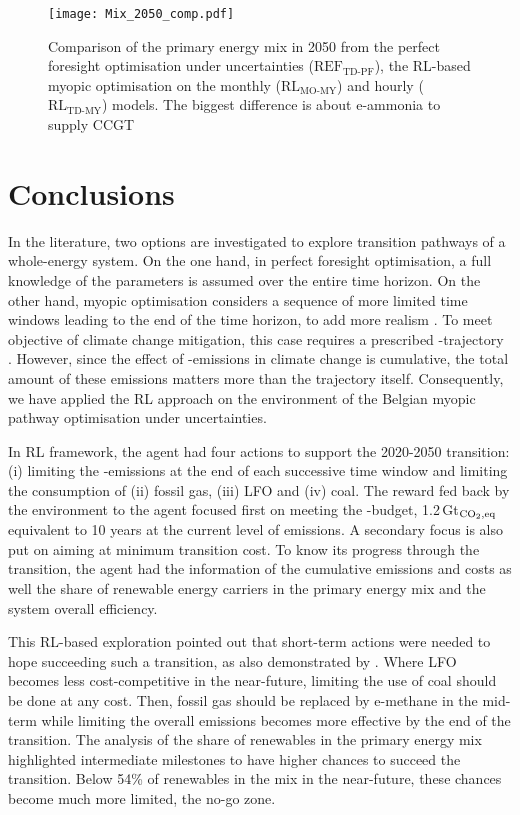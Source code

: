 \begin{figure}[!htbp]
\centering
\texttt{[image: Mix\_2050\_comp.pdf]}
\caption{Comparison of the primary energy mix in 2050 from the perfect foresight optimisation under uncertainties ($\text{REF}_{\text{TD-PF}}$), the \gls{RL}-based myopic optimisation on the monthly ($\text{RL}_{\text{MO-MY}}$) and hourly ($\text{RL}_{\text{TD-MY}}$) models. The biggest difference is about e-ammonia to supply \gls{CCGT}}
\label{fig:Mix_2050_comp}
\end{figure}


\section{Conclusions}
\label{sec:RL:conclusions}
In the literature, two options are investigated to explore transition pathways of a whole-energy system. On the one hand, in perfect foresight optimisation, a full knowledge of the parameters is assumed over the entire time horizon. On the other hand, myopic optimisation considers a sequence of more limited time windows leading to the end of the time horizon, to add more realism \cite{poncelet2016myopic}. To meet objective of climate change mitigation, this case requires a prescribed -trajectory \cite{fais2016impact}. However, since the effect of -emissions in climate change is cumulative, the total amount of these emissions matters more than the trajectory itself. Consequently, we have applied the \acrfull{RL} approach on the environment of the Belgian myopic pathway optimisation under uncertainties.

In \gls{RL} framework, the agent had four actions to support the 2020-2050 transition: (i) limiting the -emissions at the end of each successive time window and limiting the consumption of (ii) fossil gas, (iii) \acrfull{LFO} and (iv) coal. The reward fed back by the environment to the agent focused first on meeting the -budget, 1.2\,Gt$_{\ce{CO2},\text{eq}}$ equivalent to 10 years at the current level of emissions. A secondary focus is also put on aiming at minimum transition cost. To know its progress through the transition, the agent had the information of the cumulative emissions and costs as well the share of renewable energy carriers in the primary energy mix and the system overall efficiency.

This \gls{RL}-based exploration pointed out that short-term actions were needed to hope succeeding such a transition, as also demonstrated by \citet{luderer2018residual}. Where \gls{LFO} becomes less cost-competitive in the near-future, limiting the use of coal should be done at any cost. Then, fossil gas should be replaced by e-methane in the mid-term while limiting the overall emissions becomes more effective by the end of the transition. The analysis of the share of renewables in the primary energy mix highlighted intermediate milestones to have higher chances to succeed the transition. Below 54\% of renewables in the mix in the near-future, these chances become much more limited, \ie the no-go zone. 


